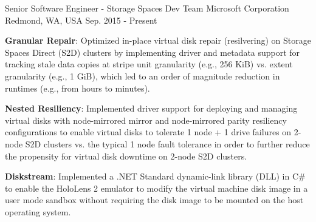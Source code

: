 

\begin{cventries}

  \cventry
    {Senior Software Engineer - Storage Spaces Dev Team} %
    {Microsoft Corporation} %
    {Redmond, WA, USA} %
    {Sep. 2015 - Present} %
    {
      \begin{cvitems} %
        \item {
          \textbf{Granular Repair}: Optimized in-place virtual disk repair (resilvering) on Storage
          Spaces Direct (S2D) clusters by implementing driver and metadata support for tracking
          stale data copies at stripe unit granularity (e.g., 256 KiB) vs. extent granularity
          (e.g., 1 GiB), which led to an order of magnitude reduction in runtimes (e.g., from hours
          to minutes).
        }
        \item {
          \textbf{Nested Resiliency}: Implemented driver support for deploying and managing virtual
          disks with node-mirrored mirror and node-mirrored parity resiliency configurations to
          enable virtual disks to tolerate 1 node + 1 drive failures on 2-node S2D clusters vs. the
          typical 1 node fault tolerance in order to further reduce the propensity for virtual disk
          downtime on 2-node S2D clusters.
        }
        \item {
          \textbf{Diskstream}: Implemented a .NET Standard dynamic-link library (DLL) in C\# to
          enable the HoloLens 2 emulator to modify the virtual machine disk image in a user mode
          sandbox without requiring the disk image to be mounted on the host operating system.
        }
      \end{cvitems}
    }


\end{cventries}

